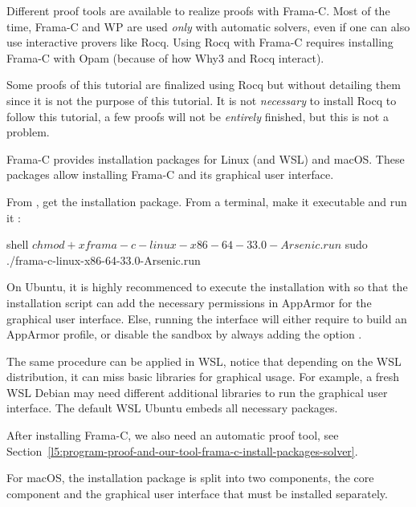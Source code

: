Different proof tools are available to realize proofs with Frama-C. Most of the
time, Frama-C and WP are used \textit{only} with automatic solvers, even if one
can also use interactive provers like Rocq. Using Rocq with Frama-C requires
installing Frama-C with Opam (because of how Why3 and Rocq interact).


Some proofs of this tutorial are finalized using Rocq but without detailing
them since it is not the purpose of this tutorial. It is not \textit{necessary}
to install Rocq to follow this tutorial, a few proofs will not be \textit{entirely}
finished, but this is not a problem.




Frama-C provides installation packages for Linux (and WSL) and macOS. These
packages allow installing Frama-C and its graphical user interface.




From ,
get the installation package. From a terminal, make it executable and run
it :


\begin{CodeBlock}{shell}
$ chmod +x frama-c-linux-x86-64-33.0-Arsenic.run
$ sudo ./frama-c-linux-x86-64-33.0-Arsenic.run
\end{CodeBlock}


On Ubuntu, it is highly recommenced to execute the installation with 
so that the installation script can add the necessary permissions in AppArmor for
the graphical user interface. Else, running the interface will either require to
build an AppArmor profile, or disable the sandbox by always adding the option
.


The same procedure can be applied in WSL, notice that depending on the WSL
distribution, it can miss basic libraries for graphical usage. For example,
a fresh WSL Debian may need different additional libraries to run the graphical
user interface. The default WSL Ubuntu embeds all necessary packages.


After installing Frama-C, we also need an automatic proof tool, see
Section~\ref{l5:program-proof-and-our-tool-frama-c-install-packages-solver}.




For macOS, the installation package is split into two components, the core
component and the graphical user interface that must be installed separately.



